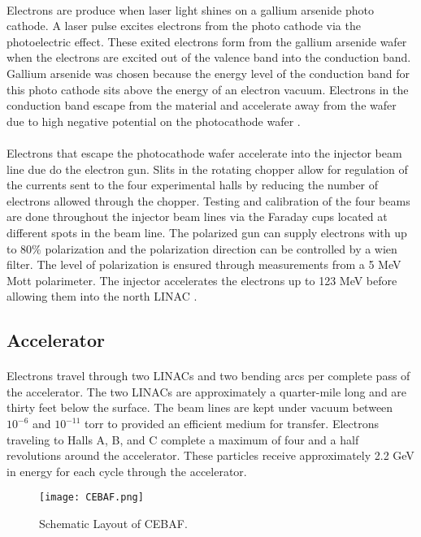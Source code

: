 	\paragraph{}Electrons are produce when laser light shines on a gallium arsenide photo cathode. A laser pulse excites electrons from the photo cathode via the photoelectric effect. These exited electrons form from the gallium arsenide wafer when the electrons are excited out of the valence band into the conduction band. Gallium arsenide was chosen because the energy level of the conduction band for this photo cathode sits above the energy of an electron vacuum. Electrons in the conduction band escape from the material and accelerate away from the wafer due to high negative potential on the photocathode wafer \cite{sane}. 
	\paragraph{}Electrons that escape the photocathode wafer accelerate into the injector beam line due do the electron gun. Slits in the rotating chopper allow for regulation of the currents sent to the four experimental halls by reducing the number of electrons allowed through the chopper. Testing and calibration of the four beams are done throughout the injector beam lines via the Faraday cups located at different spots in the beam line. The polarized gun can supply electrons with up to 80$\%$ polarization and the polarization direction can be controlled by a wien filter. The level of polarization is ensured through measurements from a 5 MeV Mott polarimeter\cite{HallA}. The injector accelerates the electrons up to 123 MeV before allowing them into the north LINAC	\cite{ref:4beams,CEBAF,ref:photogun}.
\subsection{Accelerator}
	\paragraph{} Electrons travel through two LINACs and two bending arcs per complete pass of the accelerator. The two LINACs are approximately a quarter-mile long and are thirty feet below the surface. The beam lines are kept under vacuum between $10^{-6}$ and $10^{-11}$ torr to provided an efficient medium for transfer.  Electrons traveling to Halls A, B, and C complete a maximum of four and a half revolutions around the accelerator. These particles receive approximately 2.2 GeV in energy for each cycle through the accelerator. 
	\begin{figure}[h]
		\centering
		\texttt{[image: CEBAF.png]} 
				\caption{Schematic Layout of CEBAF. }
		\label{CEBAF}
	\end{figure} 
